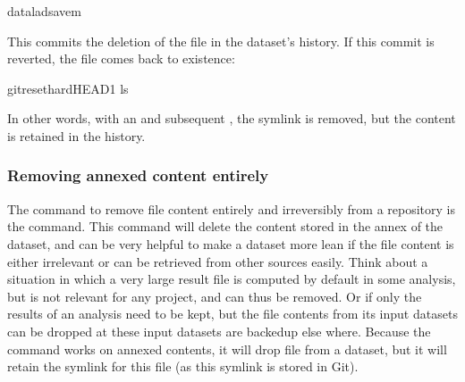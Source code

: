\begin{sphinxVerbatim}[commandchars=\\\{\}]
dataladsave\PYGZhy{}m
\end{sphinxVerbatim}

\sphinxAtStartPar
This commits the deletion of the file in the dataset’s history.
If this commit is reverted, the file comes back to existence:

%
\begin{sphinxVerbatim}[commandchars=\\\{\}]
gitreset\PYGZhy{}\PYGZhy{}hardHEAD\PYGZti{}1
ls
\end{sphinxVerbatim}
\sphinxresetverbatimhllines

\sphinxAtStartPar
In other words, with an  and subsequent ,
the symlink is removed, but the content is retained in the history.

\ignorespaces 

\subsubsection{Removing annexed content entirely}
\label{\detokenize{basics/101-136-filesystem:removing-annexed-content-entirely}}\label{\detokenize{basics/101-136-filesystem:remove}}\label{\detokenize{basics/101-136-filesystem:index-8}}
\sphinxAtStartPar
The command to remove file content entirely and irreversibly from a repository is
the  command.
This command will delete the content stored in the annex of the dataset,
and can be very helpful to make a dataset more lean if the file content is
either irrelevant or can be retrieved from other sources easily. Think about a
situation in which a very large result file is computed by default
in some analysis, but is not relevant for any project, and can thus be removed.
Or if only the results of an analysis need to be kept, but the file contents from
its input datasets can be dropped at these input datasets are backed\sphinxhyphen{}up else
where. Because the command works on annexed contents, it will drop file 
from a dataset, but it will retain the symlink for this file (as this symlink
is stored in Git).

